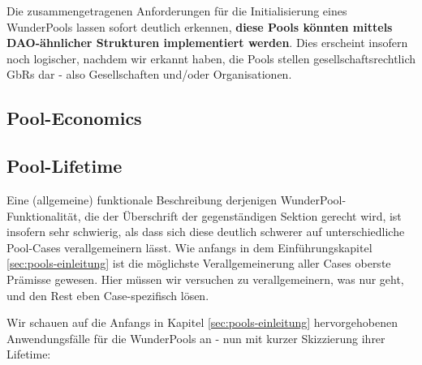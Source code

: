 \vspace{0.3cm}

Die zusammengetragenen Anforderungen für die Initialisierung eines WunderPools lassen sofort deutlich erkennen, \textbf{diese Pools könnten mittels DAO-ähnlicher Strukturen implementiert werden}. Dies erscheint insofern noch logischer, nachdem wir erkannt haben, die Pools stellen gesellschaftsrechtlich GbRs dar - also Gesellschaften und/oder Organisationen.  

\vspace{0.5cm}

\subsection{Pool-Economics}

\vspace{0.3cm}





\vspace{0.5cm}

\subsection{Pool-Lifetime}

\vspace{0.3cm}

Eine (allgemeine) funktionale Beschreibung derjenigen WunderPool-Funktionalität, die der Überschrift der gegenständigen Sektion gerecht wird, ist insofern sehr schwierig, als dass sich diese deutlich schwerer auf unterschiedliche Pool-Cases verallgemeinern lässt. Wie anfangs in dem Einführungskapitel \ref{sec:pools-einleitung} ist die möglichste Verallgemeinerung aller Cases oberste Prämisse gewesen. Hier müssen wir versuchen zu verallgemeinern, was nur geht, und den Rest eben Case-spezifisch lösen. 

\vspace{0.1cm}

Wir schauen auf die Anfangs in Kapitel \ref{sec:pools-einleitung} hervorgehobenen Anwendungsfälle für die WunderPools an - nun mit kurzer Skizzierung ihrer Lifetime:

